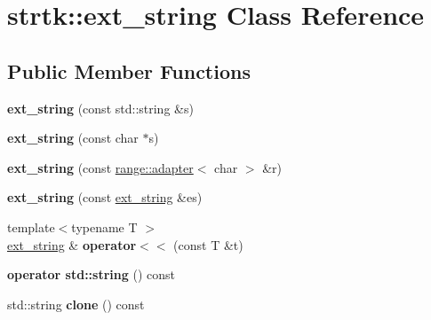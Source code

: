 \hypertarget{classstrtk_1_1ext__string}{\section{strtk\-:\-:ext\-\_\-string Class Reference}
\label{classstrtk_1_1ext__string}
}
\subsection*{Public Member Functions}
\begin{DoxyCompactItemize}
\item 
\hypertarget{classstrtk_1_1ext__string_a2e2b1988c50b76862b947a18e81f8598}{{\bfseries ext\-\_\-string} (const std\-::string \&s)}\label{classstrtk_1_1ext__string_a2e2b1988c50b76862b947a18e81f8598}

\item 
\hypertarget{classstrtk_1_1ext__string_aac355036aae1df3b11ea73ac6e677672}{{\bfseries ext\-\_\-string} (const char $\ast$s)}\label{classstrtk_1_1ext__string_aac355036aae1df3b11ea73ac6e677672}

\item 
\hypertarget{classstrtk_1_1ext__string_aa8e59978f18beb48b5bc8fe0ea2aa92b}{{\bfseries ext\-\_\-string} (const \hyperlink{classstrtk_1_1range_1_1adapter}{range\-::adapter}$<$ char $>$ \&r)}\label{classstrtk_1_1ext__string_aa8e59978f18beb48b5bc8fe0ea2aa92b}

\item 
\hypertarget{classstrtk_1_1ext__string_a34d67e0b4682c6a6e36064a621d27d71}{{\bfseries ext\-\_\-string} (const \hyperlink{classstrtk_1_1ext__string}{ext\-\_\-string} \&es)}\label{classstrtk_1_1ext__string_a34d67e0b4682c6a6e36064a621d27d71}

\item 
\hypertarget{classstrtk_1_1ext__string_addc4c0645e2997ee70795d2b772a8252}{{\footnotesize template$<$typename T $>$ }\\\hyperlink{classstrtk_1_1ext__string}{ext\-\_\-string} \& {\bfseries operator$<$$<$} (const T \&t)}\label{classstrtk_1_1ext__string_addc4c0645e2997ee70795d2b772a8252}

\item 
\hypertarget{classstrtk_1_1ext__string_a9b8a727de635835be44d15cd2461017e}{{\bfseries operator std\-::string} () const }\label{classstrtk_1_1ext__string_a9b8a727de635835be44d15cd2461017e}

\item 
\hypertarget{classstrtk_1_1ext__string_a986ffd65d26af6b32e97ee3d416c4397}{std\-::string {\bfseries clone} () const }\label{classstrtk_1_1ext__string_a986ffd65d26af6b32e97ee3d416c4397}


\end{DoxyCompactItemize}
